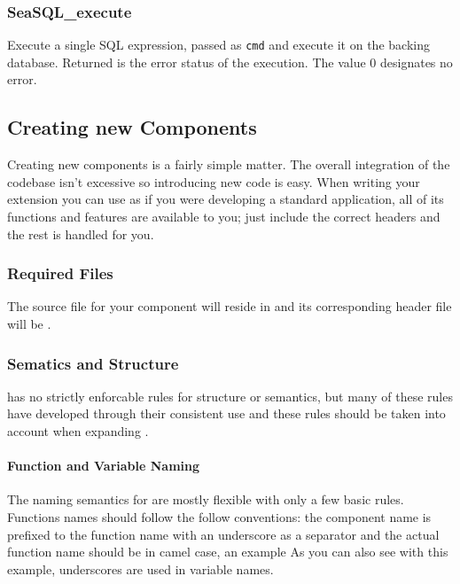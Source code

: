\subsubsection{SeaSQL\_execute} \label{extendingdbexecute}
 Execute a single SQL expression, passed as
\texttt{cmd} and execute it on the backing database. Returned is the error
status of the execution. The value 0 designates no error.

\subsection{Creating new \libseawolf{} Components} \label{extendingcomponents}
Creating new \libseawolf{} components is a fairly simple matter. The overall
integration of the codebase isn't excessive so introducing new code is
easy. When writing your extension you can use \libseawolf{} as if you were
developing a standard application, all of its functions and features are
available to you; just include the correct headers and the rest is handled for
you.

\subsubsection{Required Files} \label{extendingcomponentsfiles}
The source file for your component will reside in
and its corresponding header file will be .

\subsubsection{Sematics and Structure} \label{extendingcomponentssemantics}
\libseawolf{} has no strictly enforcable rules for structure or semantics, but
many of these rules have developed through their consistent use and these rules
should be taken into account when expanding \libseawolf{}. 

\paragraph{Function and Variable Naming}
The naming semantics for \libseawolf{} are mostly flexible with only a few basic
rules. Functions names should follow the follow conventions: the component name
is prefixed to the function name with an underscore as a separator and the
actual function name should be in camel case, an example
\hfill\vspace{8pt}\newline \indent{}
\vspace{8pt}\newline
As you can also see with this example, underscores are used in variable names.


